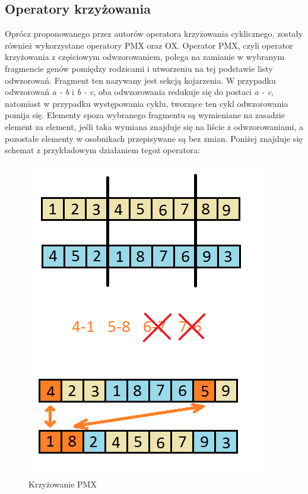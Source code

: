 \subsection{Operatory krzyżowania}
Oprócz proponowanego przez autorów operatora krzyżowania cyklicznego, zostały również wykorzystane operatory PMX oraz OX.
Operator PMX, czyli operator krzyżowania z częściowym odwzorowaniem, polega na zamianie w wybranym fragmencie genów pomiędzy rodzicami i utworzeniu na tej podstawie listy odwzorowań. Fragment ten nazywany jest sekcją kojarzenia. W przypadku odwzorowań \textit{a - b} i \textit{b - c}, oba odwzorowania redukuje się do postaci \textit{a - c}, natomiast w przypadku występowania cyklu, tworzące ten cykl odwzorowania pomija się. Elementy spoza wybranego fragmentu są wymieniane na zasadzie element za element, jeśli taka wymiana znajduje się na liście z odwzorowaniami, a pozostałe elementy w osobnikach przepisywane są bez zmian. Poniżej znajduje się schemat z przykładowym działaniem tegoż operatora:
\begin{figure}[h]
\begin{center}
\includegraphics[scale=0.7]{pmx}
\caption{Krzyżowanie PMX}
\end{center}
\end{figure}

